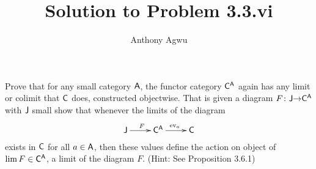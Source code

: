 \documentclass{article}
\title{Solution to Problem 3.3.vi}
\author{Anthony Agwu}
\begin{document}
\maketitle


\begin{exercise}
	
Prove that for any small category $\mathsf{A}$, the functor category $\mathsf{C}^{\mathsf{A}}$ again has any limit or colimit that $\mathsf{C}$ does, constructed objectwise. That is given a diagram ${F}\colon{\mathsf{J}}{\to}{\mathsf{C}^{\mathsf{A}}}$ with $\mathsf{J}$ small show that whenever the limits of the diagram $$ \xymatrix{\sJ \ar[r]^{F } &\sC^{\sA} \ar[r]^{\text{ev}_{a}} &\sC} $$ exists in $\mathsf{C}$ for all $a \in \mathsf{A}$, then these values define the action on object of $\lim F \in \mathsf{C}^{\mathsf{A}}$, a limit of the diagram $F$. (Hint: See Proposition 3.6.1)
	
\end{exercise}
\end{document}
